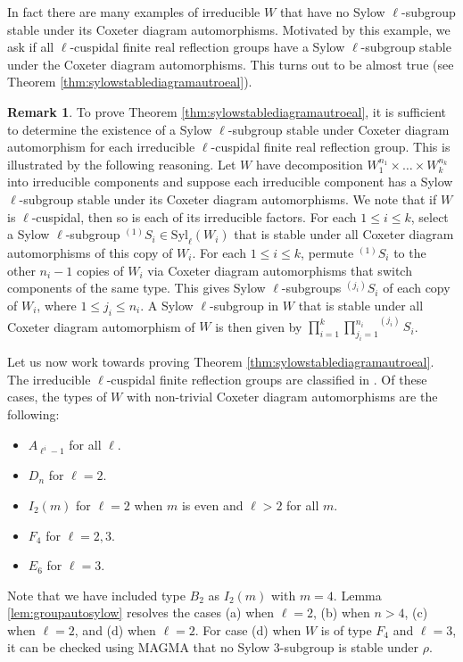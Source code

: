 \documentclass[12pt]{amsart}
\theoremstyle{plain}
\theoremstyle{definition}
\newtheorem{remark}[theorem]{Remark}
\numberwithin{equation}{section}
\numberwithin{equation}{section}
\begin{document}
	In fact there are many examples of irreducible $W$ that have no Sylow $\ell$-subgroup stable under its Coxeter diagram automorphisms. Motivated by this example, we ask if all $\ell$-cuspidal finite real reflection groups have a Sylow $\ell$-subgroup stable under the Coxeter diagram automorphisms. This turns out to be almost true (see Theorem \ref{thm:sylowstablediagramautroeal}).
	
	
	\begin{remark}\label{rem:reductiontoirred}
		To prove Theorem \ref{thm:sylowstablediagramautroeal}, it is sufficient to determine the existence of a Sylow $\ell$-subgroup stable under Coxeter diagram automorphism for each irreducible $\ell$-cuspidal finite real reflection group. This is illustrated by the following reasoning. Let $W$ have decomposition $W_1^{n_1}\times\dots\times W_k^{n_k}$ into irreducible components and suppose each irreducible component has a Sylow $\ell$-subgroup stable under its Coxeter diagram automorphisms. We note that if $W$ is $\ell$-cuspidal, then so is each of its irreducible factors. For each $1\leq i\leq k$, select a Sylow $\ell$-subgroup $^{(1)}S_i\in \text{Syl}_\ell(W_i)$ that is stable under all Coxeter diagram automorphisms of this copy of $W_i$. For each $1\leq i\leq k$, permute $^{(1)}S_i$ to the other $n_i-1$ copies of $W_i$ via Coxeter diagram automorphisms that switch components of the same type. This gives Sylow $\ell$-subgroups $^{(j_i)}S_i$ of each copy of $W_i$, where $1\leq j_i\leq n_i$. A Sylow $\ell$-subgroup in $W$ that is stable under all Coxeter diagram automorphism of $W$ is then given by $ \prod_{i=1}^{k} {\prod_{j_i=1}^{n_i}} ^{(j_i)}S_i$.
	\end{remark}
	
	Let us now work towards proving Theorem \ref{thm:sylowstablediagramautroeal}. The irreducible $\ell$-cuspidal finite reflection groups are classified in \cite[Table 2]{ME}. Of these cases, the types of $W$ with non-trivial Coxeter diagram automorphisms are the following:
	\begin{itemize}
		\item[(a)] $A_{\ell^i-1}$ for all $\ell$.
		\item[(b)] $D_n$ for $\ell=2$.
		\item[(c)] $I_2(m)$ for $\ell=2$ when $m$ is even and $\ell>2$ for all $m$.
		\item[(d)] $F_4$ for $\ell=2,3$.
		\item[(e)] $E_6$ for $\ell=3$.
	\end{itemize}
	Note that we have included type $B_2$ as $I_2(m)$ with $m=4$. Lemma \ref{lem:groupautosylow} resolves the cases (a) when $\ell=2$, (b) when $n>4$, (c) when $\ell=2$, and (d) when $\ell=2$. For case (d) when $W$ is of type $F_4$ and $\ell=3$, it can be checked using MAGMA that no Sylow $3$-subgroup is stable under $\rho$. 
	
\end{document}
